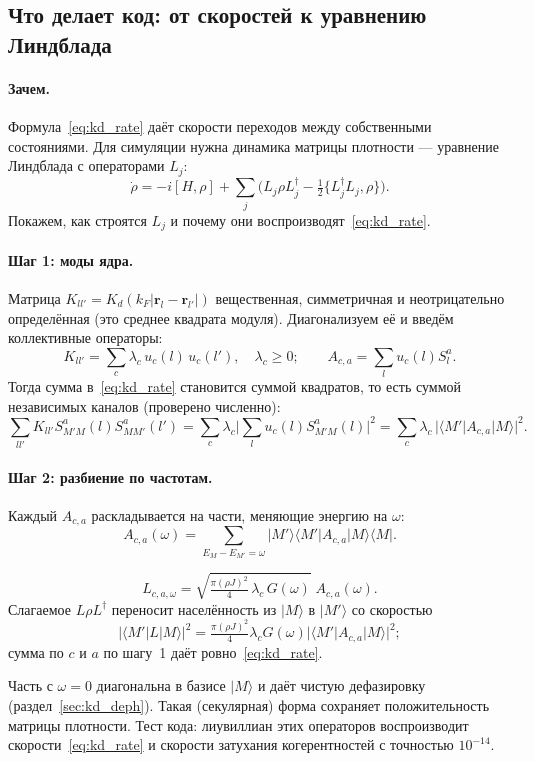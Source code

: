 \subsection{Что делает код: от скоростей к уравнению Линдблада}
\label{sec:kd_davies}

\paragraph{Зачем.} Формула~\eqref{eq:kd_rate} даёт скорости переходов между
собственными состояниями. Для симуляции нужна динамика матрицы плотности ---
уравнение Линдблада с операторами $L_j$:
\[
\dot\rho=-i[H,\rho]+\sum_j\Big(L_j\rho L_j^\dagger-\tfrac12\{L_j^\dagger L_j,\rho\}\Big).
\]
Покажем, как строятся $L_j$ и почему они воспроизводят~\eqref{eq:kd_rate}.

\paragraph{Шаг 1: моды ядра.} Матрица $K_{ll'}=K_d(k_F|\mathbf r_l-\mathbf r_{l'}|)$
вещественная, симметричная и неотрицательно определённая (это среднее
квадрата модуля). Диагонализуем её и введём коллективные операторы:
\[
K_{ll'}=\sum_c\lambda_c\,u_c(l)\,u_c(l'),\quad \lambda_c\ge0;\qquad
A_{c,a}=\sum_lu_c(l)S^a_l .
\]
Тогда сумма в~\eqref{eq:kd_rate} становится суммой квадратов, то есть суммой
независимых каналов (проверено численно):
\[
\sum_{ll'}K_{ll'}S^a_{M'M}(l)S^a_{MM'}(l')
=\sum_c\lambda_c\Big|\sum_lu_c(l)S^a_{M'M}(l)\Big|^2
=\sum_c\lambda_c\,|\langle M'|A_{c,a}|M\rangle|^2 .
\]

\paragraph{Шаг 2: разбиение по частотам.} Каждый $A_{c,a}$ раскладывается на
части, меняющие энергию на $\omega$:
\[
A_{c,a}(\omega)=\sum_{E_M-E_{M'}=\omega}|M'\rangle\langle M'|A_{c,a}|M\rangle\langle M| .
\]
\begin{resbox}
\[
L_{c,a,\omega}=\sqrt{\tfrac{\pi(\rho J)^2}{4}\,\lambda_c\,G(\omega)}\;A_{c,a}(\omega).
\]
Слагаемое $L\rho L^\dagger$ переносит населённость из $|M\rangle$ в $|M'\rangle$ со скоростью
\[
|\langle M'|L|M\rangle|^2=\tfrac{\pi(\rho J)^2}{4}\lambda_cG(\omega)|\langle M'|A_{c,a}|M\rangle|^2;
\]
сумма по $c$ и $a$ по шагу~1 даёт ровно~\eqref{eq:kd_rate}.
\end{resbox}
Часть с $\omega=0$ диагональна в базисе $|M\rangle$ и даёт чистую дефазировку
(раздел~\ref{sec:kd_deph}). Такая (секулярная) форма сохраняет положительность
матрицы плотности. Тест кода: лиувиллиан этих операторов воспроизводит
скорости~\eqref{eq:kd_rate} и скорости затухания когерентностей с точностью
$10^{-14}$.
